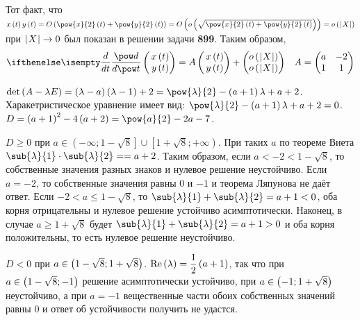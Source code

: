 \documentclass[a5paper,10pt]{article}
\begin{document}
Тот факт, что
$x\br{t} y\br{t} 
    = O\br{\pow{x}{2}\br{t} + \pow{y}{2}\br{t}} 
    = O\br{o\br{\sqrt{\pow{x}{2}\br{t} + \pow{y}{2}\br{t}}}} 
    = o\br{\vbr{X}}$ при $\hspace{0.2mm}\left|\hspace{0.06em}X\hspace{0.06em}\right| \to 0$
был показан в решении задачи \textbf{899}. Таким образом,
\begin{align*} 
    \der{}{t} \begin{pmatrix} \,x\br{t} \\ \,y\br{t} \end{pmatrix} 
        = A \begin{pmatrix} \,x\br{t} \\ \,y\br{t} \end{pmatrix} 
            + \begin{pmatrix} o\br{\vbr{X}} \\ o\br{\vbr{X}} \end{pmatrix}
    && A = \begin{pmatrix} a & -2 \\ 1 & 1 \end{pmatrix}
\end{align*}

$\det\br{A - \lambda E} 
    = \br{\lambda - a}\br{\lambda - 1} + 2 
    = \pow{\lambda}{2} - \br{a + 1} \lambda + a + 2$.
Харакетристическое уравнение имеет вид:
$\pow{\lambda}{2} - \br{a + 1} \lambda + a + 2 = 0$.
$D = \br{a + 1}^2 - 4\br{a + 2} = \pow{a}{2} - 2a - 7$.

$D \ge 0$ при 
$a \in \left(-\infty; 1 - \sqrt{8} \right] \cup \left[1 + \sqrt{8}; +\infty \right)$.
При таких $a$ по теореме Виета 
$\sub{\lambda}{1} \cdot \sub{\lambda}{2} = \linebreak = a + 2$.
Таким образом, если $a < -2 < 1 - \sqrt{8}$,
то собственные значения разных знаков и нулевое решение неустойчиво. 
Если $a = -2$, то собственные значения равны $0$ и $-1$ и теорема Ляпунова не даёт ответ. 
Если $-2 < a \le 1 - \sqrt{8}$, то $\sub{\lambda}{1} + \sub{\lambda}{2} = a + 1 < 0$,
оба корня отрицательны и нулевое решение устойчиво асимптотически. 
Наконец, в случае $a \ge 1 + \sqrt{8}$ будет $\sub{\lambda}{1} + \sub{\lambda}{2} = a + 1 > 0$
и оба корня положительны, то есть нулевое решение неустойчиво.

$D < 0$ при $a \in \left(\hspace{0.01em}1 - \sqrt{8}; 1 + \sqrt{8}\hspace{0.01em}\right)$. 
$\operatorname{Re}\left(\hspace{0.01em}\lambda\hspace{0.01em}\right) = \dfrac {1} {2} \left(\hspace{0.01em}a + 1\hspace{0.01em}\right)$,
так что при $a \in \left(\hspace{0.01em}1 - \sqrt{8}; -1\hspace{0.01em}\right)$ решение асимптотически устойчиво, 
при $a \in \left(\hspace{0.01em}-1; 1 + \sqrt{8}\hspace{0.01em}\right)$ неустойчиво, а при $a = -1$ вещественные части 
обоих собственных значений равны $0$ и ответ об устойчивости получить не удастся.
\end{document}
